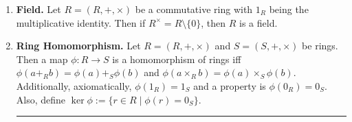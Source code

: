 \begin{enumerate}
	\item \textbf{Field. } Let $R = (R,+,\times)$ be a commutative ring with $1_R$ being the multiplicative identity. Then if $R^\times = R \setminus \{0\}$, then $R$ is a field. 
	\item \textbf{Ring Homomorphism. } Let $R = (R,+,\times)$ and $S=(S,+,\times)$ be rings. Then a map $\phi: R \to S$ is a homomorphism of rings iff $\phi(a +_R b) = \phi(a) +_S \phi(b)$ and $\phi(a \times_R b) = \phi(a) \times_S \phi(b)$. Additionally, axiomatically, $\phi(1_R)=1_S$ and a property is $\phi(0_R) = 0_S$. Also, define $\ker\phi := \{r \in R \mid \phi(r) = 0_S\}$. 
	\begin{center}
		\hrule
	\end{center}
\end{enumerate}



